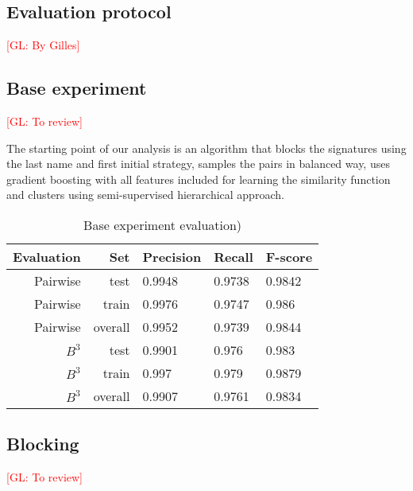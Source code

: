 \documentclass{article}
\newcommand{\glnote}[1]{\textcolor{red}{[GL: #1]}}
\begin{document}
\subsection{Evaluation protocol}

\glnote{By Gilles}


\subsection{Base experiment}

\glnote{To review}

The starting point of our analysis is an algorithm that blocks the signatures using the last
name and first initial strategy, samples the pairs in balanced way, uses gradient boosting
with all features included for learning the similarity function and clusters using
semi-supervised hierarchical approach.

\begin{table}[H]
\caption{Base experiment evaluation)}
\centering
\begin{tabular}{|r|r|l|l|l|}
  \hline
  Evaluation & Set & Precision & Recall & F-score \\
  \hline
  Pairwise & test & 0.9948 & 0.9738 & 0.9842 \\
  \hline
  Pairwise & train & 0.9976 & 0.9747 & 0.986 \\
  \hline
  Pairwise & overall & 0.9952 & 0.9739 & 0.9844 \\
  \hline
  $B^3$ & test & 0.9901 & 0.976 & 0.983 \\
  \hline
  $B^3$ & train & 0.997 & 0.979 & 0.9879 \\
  \hline
  $B^3$ & overall & 0.9907 & 0.9761 & 0.9834 \\
  \hline
\end{tabular}
\end{table}

\subsection{Blocking}

\glnote{To review}
\end{document}

